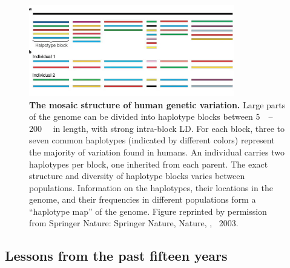 \begin{figure}
    \centering
    \includegraphics[width=0.8\textwidth,page=1]{mainmatter/figures/chapter_01/paabo2003MosaicThatOur/41586_2003_Article_BFnature01400_Fig3_HTML.png}
    \caption[
    ]{
        \textbf{The mosaic structure of human genetic variation.}
        Large parts of the genome can be divided into haplotype blocks between \SIrange{5}{200}{\kilo\bp} in length, with strong intra-block \gls{LD}.
        For each block, three to seven common haplotypes (indicated by different colors) represent the majority of variation found in humans.
        An individual carries two haplotypes per block, one inherited from each parent.
        The exact structure and diversity of haplotype blocks varies between populations.
        Information on the haplotypes, their locations in the genome, and their frequencies in different populations form a \enquote{haplotype map} of the genome.
        Figure reprinted by permission from Springer Nature: Springer Nature, Nature, \textcite{paabo2003MosaicThatOur}, \textcopyright~2003.
    }
    \label{fig:intro_haplotypeBlocks}
\end{figure}

\subsection{Lessons from the past fifteen years}

